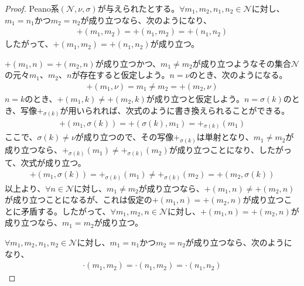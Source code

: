 \documentclass[dvipdfmx]{jsarticle}
\begin{document}
\begin{proof}
Peano系$\left( \mathcal{N,}\nu,\sigma \right)$が与えられたとする。$\forall m_{1},m_{2},n_{1},n_{2}\in \mathcal{N}$に対し、$m_{1} = n_{1}$かつ$m_{2} = n_{2}$が成り立つなら、次のようになり、
\begin{align*}
+ \left( m_{1},m_{2} \right) = + \left( n_{1},m_{2} \right) = + \left( n_{1},n_{2} \right)
\end{align*}
したがって、$+ \left( m_{1},m_{2} \right) = + \left( n_{1},n_{2} \right)$が成り立つ。\par
$+ \left( m_{1},n \right) = + \left( m_{2},n \right)$が成り立つかつ、$m_{1} \neq m_{2}$が成り立つようなその集合$\mathcal{N}$の元々$m_{1}$、$m_{2}$、$n$が存在すると仮定しよう。$n = \nu$のとき、次のようになる。
\begin{align*}
+ \left( m_{1},\nu \right) = m_{1} \neq m_{2} = + \left( m_{2},\nu \right)
\end{align*}
$n = k$のとき、$+ \left( m_{1},k \right) \neq + \left( m_{2},k \right)$が成り立つと仮定しよう。$n = \sigma(k)$のとき、写像$+_{\sigma(k)}$が用いられれば、次式のように書き換えられることができる。
\begin{align*}
+ \left( m_{1},\sigma(k) \right) = + \left( \sigma(k),m_{1} \right) = +_{\sigma(k)}\left( m_{1} \right)
\end{align*}
ここで、$\sigma(k) \neq \nu$が成り立つので、その写像$+_{\sigma(k)}$は単射となり、$m_{1} \neq m_{2}$が成り立つなら、$+_{\sigma(k)}\left( m_{1} \right) \neq +_{\sigma(k)}\left( m_{2} \right)$が成り立つことになり、したがって、次式が成り立つ。
\begin{align*}
+ \left( m_{1},\sigma(k) \right) = +_{\sigma(k)}\left( m_{1} \right) \neq +_{\sigma(k)}\left( m_{2} \right) = + \left( m_{2},\sigma(k) \right)
\end{align*}
以上より、$\forall n \in \mathcal{N}$に対し、$m_{1} \neq m_{2}$が成り立つなら、$+ \left( m_{1},n \right) \neq + \left( m_{2},n \right)$が成り立つことになるが、これは仮定の$+ \left( m_{1},n \right) = + \left( m_{2},n \right)$が成り立つことに矛盾する。したがって、$\forall m_{1},m_{2},n \in \mathcal{N}$に対し、$+ \left( m_{1},n \right) = + \left( m_{2},n \right)$が成り立つなら、$m_{1} = m_{2}$が成り立つ。\par
$\forall m_{1},m_{2},n_{1},n_{2}\in \mathcal{N}$に対し、$m_{1} = n_{1}$かつ$m_{2} = n_{2}$が成り立つなら、次のようになり、
\begin{align*}
\cdot \left( m_{1},m_{2} \right) = \cdot \left( n_{1},m_{2} \right) = \cdot \left( n_{1},n_{2} \right)
\end{align*}

\end{proof}
\end{document}
